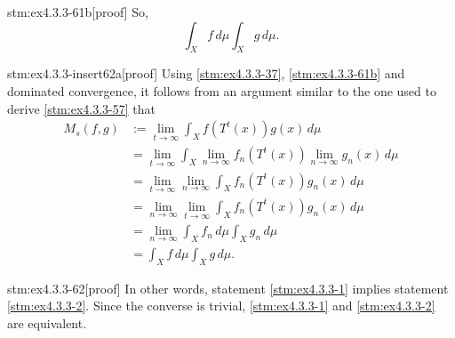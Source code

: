 \begin{stm}{stm:ex4.3.3-61b}[proof]
So,
\[
\int_X f \, d\mu \int_X g \, d\mu.
\]
\end{stm}

\begin{stm}{stm:ex4.3.3-insert62a}[proof]
Using \ref{stm:ex4.3.3-37}, \ref{stm:ex4.3.3-61b} and dominated convergence, it follows from an argument similar to the one used to derive \ref{stm:ex4.3.3-57} that
\begin{align*}
M_s(f, g) 
&:= \lim_{t \to \infty} \int_X f(T^t(x)) g(x) \, d\mu \\
&= \lim_{t \to \infty} \int_X \lim_{n \to \infty} f_n(T^t(x)) \lim_{n \to \infty} g_n(x) \, d\mu \\
&= \lim_{t \to \infty} \lim_{n \to \infty} \int_X f_n(T^t(x)) g_n(x) \, d\mu \\
&= \lim_{n \to \infty} \lim_{t \to \infty} \int_X f_n(T^t(x)) g_n(x) \, d\mu \\
&= \lim_{n \to \infty} \int_X f_n \, d\mu \int_X g_n \, d\mu \\
&= \int_X f \, d\mu \int_X g \, d\mu.
\end{align*}
\end{stm}

\begin{stm}{stm:ex4.3.3-62}[proof]
In other words, statement \ref{stm:ex4.3.3-1} implies statement \ref{stm:ex4.3.3-2}. Since the converse is trivial, \ref{stm:ex4.3.3-1} and \ref{stm:ex4.3.3-2} are equivalent.
\end{stm}